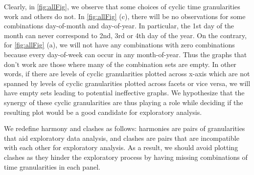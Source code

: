 \documentclass[12pt]{article}
\begin{document}
Clearly, in \autoref{fig:allFig}, we observe that some choices of cyclic time granularities work and others do not. In \autoref{fig:allFig} (c), there will be no observations for some combinations day-of-month and day-of-year. In particular, the 1st day of the month can never correspond to 2nd, 3rd or 4th day of the year. On the contrary, for \autoref{fig:allFig} (a), we will not have any combinations with zero combinations because every day-of-week can occur in any month-of-year. Thus the graphs that don't work are those where many of the combination sets are empty. In other words, if there are levels of cyclic granularities plotted across x-axis which are not spanned by levels of cyclic granularities plotted across facets or vice versa, we will have empty sets leading to potential ineffective graphs. We hypothesize that the synergy of these cyclic granularities are thus playing a role while deciding if the resulting plot would be a good candidate for exploratory analysis.

We redefine harmony and clashes as follows: harmonies are pairs of granularities that aid exploratory data analysis, and clashes are pairs that are incompatible with each other for exploratory analysis. As a result, we should avoid plotting clashes as they hinder the exploratory process by having missing combinations of time granularities in each panel.
\end{document}
